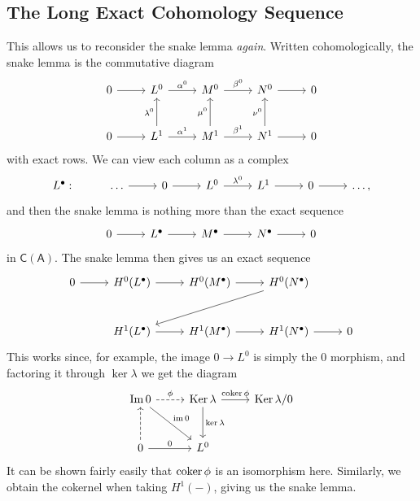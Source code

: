 \subsection{The Long Exact Cohomology Sequence}
This allows us to reconsider the snake lemma \emph{again}. Written cohomologically, the snake lemma is the commutative diagram
\[\begin{tikzcd}[row sep = 2.5em, column sep = 2.5em]
	0\arrow[r]&L^0\arrow[r, "\alpha ^0"]&M^0\arrow[r, "\beta ^0"]&N^0\arrow[r]&0\\
	0\arrow[r]&L^1\ar[u, "\lambda ^0"]\ar[r, "\alpha ^1"]&M^1\ar[u, "\mu ^0"]\ar[r, "\beta ^1"]&N^1\ar[r]\ar[u, "\nu ^0"]&0
\end{tikzcd}\]
with exact rows. We can view each column as a complex
\[\begin{tikzcd}[row sep = 2.5em, column sep = 2.5em]
	L^\bullet :&\ldots \ar[r]&0\ar[r]&L^0\ar[r, "\lambda ^0"]&L^1\ar[r]&0\ar[r]&\ldots ,
\end{tikzcd}\]
and then the snake lemma is nothing more than the exact sequence
\[\begin{tikzcd}[row sep = 2.5em, column sep = 2.5em]
	0\ar[r]&L^\bullet \ar[r]&M^\bullet \ar[r]&N^\bullet \ar[r]&0
\end{tikzcd}\]
in $\mathsf{C} (\mathsf{A} )$. The snake lemma then gives us an exact sequence
\[\begin{tikzcd}[row sep = 2.5em, column sep = 2.5em]
	0\ar[r]&H^0(L^\bullet )\ar[r]&H^0(M^\bullet )\ar[r]&H^0(N^\bullet )\ar[dll]\\
	       &H^1(L^\bullet )\ar[r]&H^1(M^\bullet )\ar[r]&H^1(N^\bullet )\ar[r]&0
\end{tikzcd}\]
This works since, for example, the image $0\to L^0$ is simply the 0 morphism, and factoring it through $\ker \lambda $ we get the diagram
\[\begin{tikzcd}[row sep = 2.5em, column sep = 2.5em]
	\operatorname{Im } 0\ar[r, dashed, "\phi "]\ar[dr, "\im 0"]&\operatorname{Ker}\lambda \ar[r, "\coker \phi "]\ar[d, "\ker \lambda "]&\operatorname{Ker} \lambda /0\\
	0\ar[u, dashed]\ar[r, "0"]&L^0
\end{tikzcd}\]
It can be shown fairly easily that $\operatorname{coker} \phi $ is an isomorphism here. Similarly, we obtain the cokernel when taking $H^1(-)$, giving us the snake lemma.

